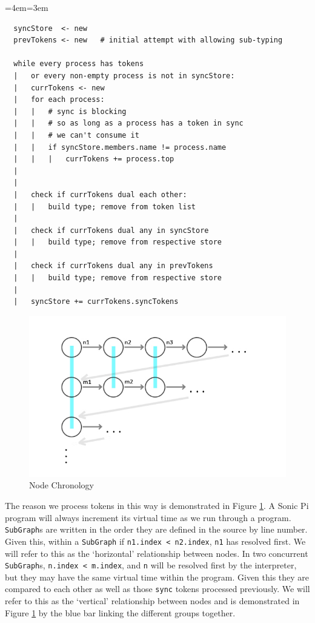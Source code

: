 \documentclass[11pt, abstracton, twoside, titlepage=true]{scrartcl}
\newenvironment{blockquote}{
	\par
	\medskip
	\leftskip=4em\rightskip=3em
	\noindent\ignorespaces
}{
	\par\medskip
}
\begin{document}
\begin{blockquote}
	\begin{lstlisting}
  syncStore  <- new
  prevTokens <- new   # initial attempt with allowing sub-typing

  while every process has tokens
  |   or every non-empty process is not in syncStore:
  |   currTokens <- new
  |   for each process:
  |   |   # sync is blocking
  |   |   # so as long as a process has a token in sync
  |   |   # we can't consume it
  |   |   if syncStore.members.name != process.name
  |   |   |   currTokens += process.top
  |
  |
  |   check if currTokens dual each other:
  |   |   build type; remove from token list
  |	
  |   check if currTokens dual any in syncStore
  |   |   build type; remove from respective store
  |   
  |   check if currTokens dual any in prevTokens
  |   |   build type; remove from respective store
  |
  |   syncStore += currTokens.syncTokens
	\end{lstlisting}
\end{blockquote}

\begin{figure}[h!]
	\centering
	\includegraphics[width=\textwidth]{images/GraphOneFix.jpg}
	\caption{Node Chronology} \label{nodegraphone}
\end{figure}

The reason we process tokens in this way is demonstrated in Figure 
\ref{nodegraphone}. A Sonic Pi program will always increment its virtual 
time as we run through a program. \texttt{SubGraph}s are written in the order 
they are defined in the source by line number. Given this, within a 
\texttt{SubGraph} if \texttt{n1.index < n2.index}, \texttt{n1} has resolved 
first. We will refer to this as the `horizontal' relationship 
between nodes. In two concurrent \texttt{SubGraph}s, \texttt{n.index < m.index}, 
and \texttt{n} will be resolved first by the interpreter, but they may have the 
same virtual time within the program. Given this they are compared to each other as 
well as those \texttt{sync} tokens processed previously. We will refer to this as 
the `vertical' relationship between nodes and is demonstrated in Figure 
\ref{nodegraphone} by the blue bar linking the different groups together.
\end{document}
